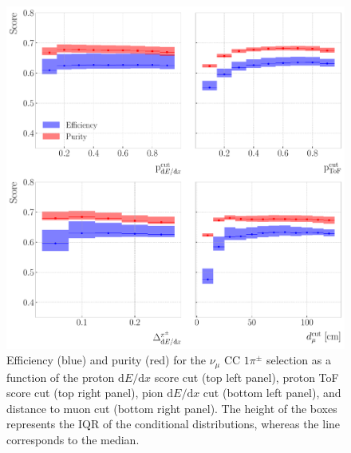 \begin{figure}[t]
    \centering
    \includegraphics[width=.85\linewidth]{Images/GAr_selection/pion_selection_1_pions_metrics.pdf}
    \caption[Efficiency and purity for the $\nu_{\mu}$ CC $1\pi^{\pm}$ selection as a function of the different cuts.]{Efficiency (blue) and purity (red) for the $\nu_{\mu}$ CC $1\pi^{\pm}$ selection as a function of the proton $\mathrm{d}E/\mathrm{d}x$ score cut (top left panel), proton ToF score cut (top right panel), pion $\mathrm{d}E/\mathrm{d}x$ cut (bottom left panel), and distance to muon cut (bottom right panel). The height of the boxes represents the IQR of the conditional distributions, whereas the line corresponds to the median.}
    \label{fig:pion_selection_1_pions_metrics}
\end{figure}

